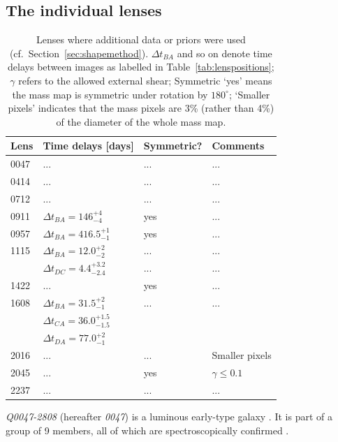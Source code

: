 \documentclass[useAMS,usenatbib]{mn2e}
\begin{document}
\subsection{The individual lenses}
\setlength\tabcolsep{5pt}
\begin{table}
  \begin{center} \begin{tabular}{l l l l}
      Lens & Time delays [days] & Symmetric? & Comments \\ \hline
      0047 & ... & ... & ... \\
      0414 & ... & ... & ... \\
      0712 & ... & ... & ... \\
      0911 & $\Delta t_{BA}=146^{+4}_{-4}$ & yes & ... \\
      0957 & $\Delta t_{BA}=416.5^{+1}_{-1}$ & yes & ... \\
      1115 & $\Delta t_{BA}=12.0^{+2}_{-2}$ & ... & ... \\
           & $\Delta t_{DC}=4.4^{+3.2}_{-2.4}$ & ... & ... \\
      1422 & ... & yes & ... \\
      1608 & $\Delta t_{BA}=31.5^{+2}_{-1}$ & ... & ... \\
           & $\Delta t_{CA}=36.0^{+1.5}_{-1.5}$ & \\
           & $\Delta t_{DA}=77.0^{+2}_{-1}$ & \\
      2016 & ... & ... & Smaller pixels \\
      2045 & ... & yes & $\gamma\leq 0.1$ \\
      2237 & ... & ... & ... \\
    \end{tabular}
    \caption[width=\linewidth]{Lenses where additional data or priors were used (cf.~Section~\ref{sec:shapemethod}). $\Delta t_{BA}$ and so on denote time delays between images as labelled in Table~\ref{tab:lenspositions}; $\gamma$ refers to the allowed external shear; Symmetric `yes' means the mass map is symmetric under rotation by $180^\circ$; `Smaller pixels' indicates that the mass pixels are 3\% (rather than 4\%) of the diameter of the whole mass map.}
    \label{tab:lenspriors}
  \end{center}
\end{table}
\setlength\tabcolsep{6pt}

\textit{Q0047-2808} (hereafter \textit{0047}) is a luminous early-type galaxy \citep{1996MNRAS.278..139W}. It is part of a group of 9 members, all of which are spectroscopically confirmed \citep{2011ApJ...726...84W}.
\end{document}
